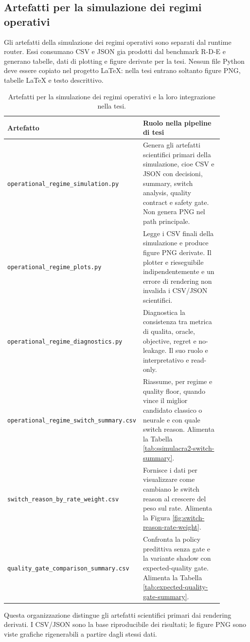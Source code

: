 \subsection{Artefatti per la simulazione dei regimi operativi}
\label{sec:artefatti-regimi-operativi}

Gli artefatti della simulazione dei regimi operativi sono separati dal
runtime router. Essi consumano CSV e JSON gia prodotti dal benchmark
R-D-E e generano tabelle, dati di plotting e figure derivate per la
tesi. Nessun file Python deve essere copiato nel progetto LaTeX: nella
tesi entrano soltanto figure PNG, tabelle LaTeX e testo descrittivo.

\begin{table}[t]
\centering
\caption{Artefatti per la simulazione dei regimi operativi e la loro integrazione nella tesi.}
\label{tab:operational-regime-thesis-artifacts}
\begin{tabular}{p{0.30\linewidth} p{0.58\linewidth}}
\toprule
Artefatto & Ruolo nella pipeline di tesi \\
\midrule
\texttt{operational\_regime\_simulation.py} &
Genera gli artefatti scientifici primari della simulazione, cioe CSV e
JSON con decisioni, summary, switch analysis, quality contract e safety
gate. Non genera PNG nel path principale. \\
\texttt{operational\_regime\_plots.py} &
Legge i CSV finali della simulazione e produce figure PNG derivate. Il
plotter e rieseguibile indipendentemente e un errore di rendering non
invalida i CSV/JSON scientifici. \\
\texttt{operational\_regime\_diagnostics.py} &
Diagnostica la consistenza tra metrica di qualita, oracle, objective,
regret e no-leakage. Il suo ruolo e interpretativo e read-only. \\
\texttt{operational\_regime\_switch\_summary.csv} &
Riassume, per regime e quality floor, quando vince il miglior candidato
classico o neurale e con quale switch reason. Alimenta la Tabella
\ref{tab:ssimulacra2-switch-summary}. \\
\texttt{switch\_reason\_by\_rate\_weight.csv} &
Fornisce i dati per visualizzare come cambiano le switch reason al
crescere del peso sul rate. Alimenta la Figura
\ref{fig:switch-reason-rate-weight}. \\
\texttt{quality\_gate\_comparison\_summary.csv} &
Confronta la policy predittiva senza gate e la variante shadow con
expected-quality gate. Alimenta la Tabella
\ref{tab:expected-quality-gate-summary}. \\
\bottomrule
\end{tabular}
\end{table}

Questa organizzazione distingue gli artefatti scientifici primari dai
rendering derivati. I CSV/JSON sono la base riproducibile dei risultati;
le figure PNG sono viste grafiche rigenerabili a partire dagli stessi
dati.
